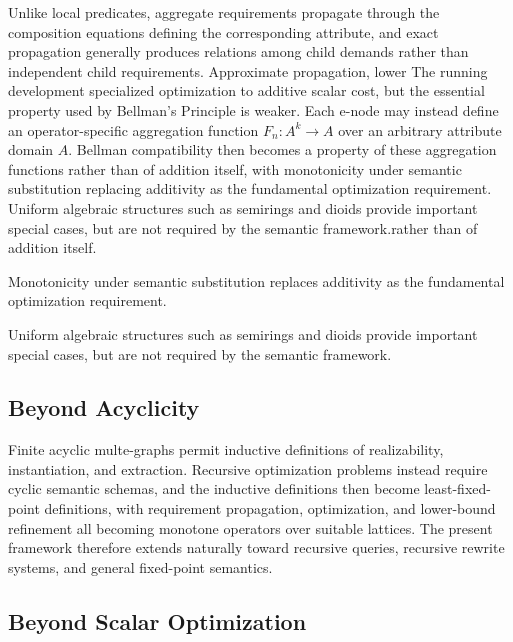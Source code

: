 \documentclass[sigconf,nonacm]{acmart}
\theoremstyle{definition}
\theoremstyle{plain}
\theoremstyle{remark}
\begin{document}
Unlike local predicates, aggregate requirements propagate through the
composition equations defining the corresponding attribute, and exact
propagation generally produces relations among child demands rather
than independent child requirements.  Approximate propagation, lower
The running development specialized optimization to additive scalar
cost, but the essential property used by Bellman's Principle is weaker.
Each e-node may instead define an operator-specific aggregation
function \(F_n:A^k\rightarrow A\)
over an arbitrary attribute domain \(A\).  Bellman compatibility then
becomes a property of these aggregation functions rather than of
addition itself, with monotonicity under semantic substitution
replacing additivity as the fundamental optimization requirement.
Uniform algebraic structures such as semirings and dioids provide
important special cases, but are not required by the semantic
framework.rather than of addition itself.

Monotonicity under semantic substitution replaces additivity as the
fundamental optimization requirement.

Uniform algebraic structures such as semirings and dioids provide
important special cases, but are not required by the semantic
framework.

\subsection{Beyond Acyclicity}

Finite acyclic multe-graphs permit inductive definitions of
realizability, instantiation, and extraction.  Recursive optimization
problems instead require cyclic semantic schemas, and the inductive
definitions then become least-fixed-point definitions, with requirement
propagation, optimization, and lower-bound refinement all becoming
monotone operators over suitable lattices.  The present framework
therefore extends naturally toward recursive queries, recursive rewrite
systems, and general fixed-point semantics.

\subsection{Beyond Scalar Optimization}
\end{document}
